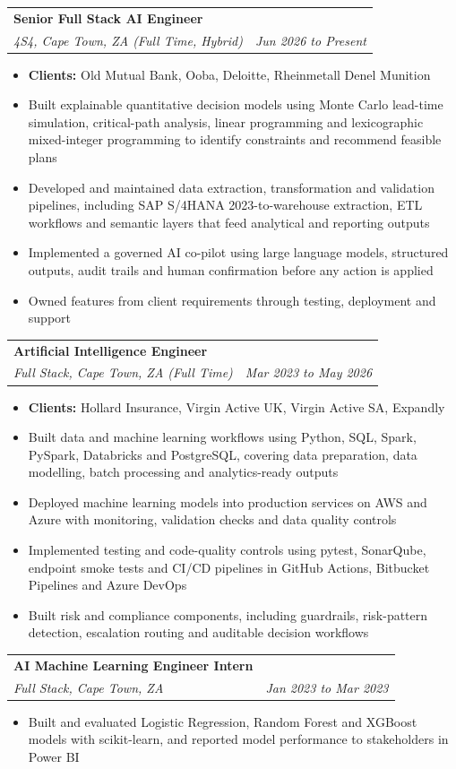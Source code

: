 \documentclass[letterpaper,11pt]{article}
\makeatletter
\newcommand{\resumeItem}[1]{
  \item\small{
    {#1 \vspace{-1pt}}
  }
}
\newcommand{\resumeSubheading}[4]{
  \vspace{-2pt}\item
    \begin{tabular*}{1.0\textwidth}[t]{l@{\extracolsep{\fill}}r}
      \textbf{\large#1} & \textbf{\small #2} \\
      \textit{\large#3} & \textit{\small #4} \\

    \end{tabular*}\vspace{-7pt}
}
\newcommand{\resumeItemListStart}{\begin{itemize}[leftmargin=0.1in]}
\newcommand{\resumeItemListEnd}{\end{itemize}\vspace{-5pt}}
\makeatother
\begin{document}
    \resumeSubheading
      {Senior Full Stack AI Engineer}{}
      {4S4, Cape Town, ZA (Full Time, Hybrid)}{Jun 2026 to Present}
      \resumeItemListStart
            \resumeItem{\small{\textbf{Clients:} Old Mutual Bank, Ooba, Deloitte, Rheinmetall Denel Munition}}
            \resumeItem{\small{Built explainable quantitative decision models using Monte Carlo lead-time simulation, critical-path analysis, linear programming and lexicographic mixed-integer programming to identify constraints and recommend feasible plans}}
            \resumeItem{\small{Developed and maintained data extraction, transformation and validation pipelines, including SAP S/4HANA 2023-to-warehouse extraction, ETL workflows and semantic layers that feed analytical and reporting outputs}}
            \resumeItem{\small{Implemented a governed AI co-pilot using large language models, structured outputs, audit trails and human confirmation before any action is applied}}
            \resumeItem{\small{Owned features from client requirements through testing, deployment and support}}
      \resumeItemListEnd
      \vspace{2pt}

    \resumeSubheading
      {Artificial Intelligence Engineer}{}
      {Full Stack, Cape Town, ZA (Full Time)}{Mar 2023 to May 2026}
      \resumeItemListStart
            \resumeItem{\small{\textbf{Clients:} Hollard Insurance, Virgin Active UK, Virgin Active SA, Expandly}}
            \resumeItem{\small{Built data and machine learning workflows using Python, SQL, Spark, PySpark, Databricks and PostgreSQL, covering data preparation, data modelling, batch processing and analytics-ready outputs}}
            \resumeItem{\small{Deployed machine learning models into production services on AWS and Azure with monitoring, validation checks and data quality controls}}
            \resumeItem{\small{Implemented testing and code-quality controls using pytest, SonarQube, endpoint smoke tests and CI/CD pipelines in GitHub Actions, Bitbucket Pipelines and Azure DevOps}}
            \resumeItem{\small{Built risk and compliance components, including guardrails, risk-pattern detection, escalation routing and auditable decision workflows}}
      \resumeItemListEnd
      \vspace{2pt}

    \resumeSubheading
      {AI Machine Learning Engineer Intern}{}
      {Full Stack, Cape Town, ZA}{Jan 2023 to Mar 2023}
      \resumeItemListStart
            \resumeItem{\small{Built and evaluated Logistic Regression, Random Forest and XGBoost models with scikit-learn, and reported model performance to stakeholders in Power BI}}
      \resumeItemListEnd
      \vspace{2pt}
\end{document}
